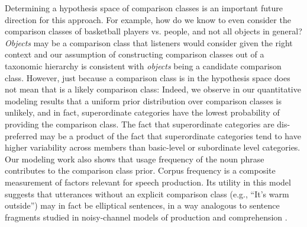 \documentclass[doc, floatsintext]{apa6}
\newcommand{\mht}[1]{\textcolor{Blue}{[mht: #1]}}
\begin{document}
Determining a hypothesis space of comparison classes is an important future direction for this approach.
For example, how do we know to even consider the comparison classes of basketball players vs. people, and not all objects in general?
\emph{Objects} may be a comparison class that listeners would consider given the right context and our assumption of constructing comparison classes out of a taxonomic hierarchy is consistent with \emph{objects} being a candidate comparison class.
However, just because a comparison class is in the hypothesis space does not mean that is a likely comparison class: Indeed, we observe in our quantitative modeling results that a uniform prior distribution over comparison classes is unlikely, and in fact, superordinate categories have the lowest probability of providing the comparison class.
The fact that superordinate categories are dis-preferred may be a product of the fact that superordinate categories tend to have higher variability across members than basic-level or subordinate level categories.
Our modeling work also shows that usage frequency of the noun phrase contributes to the comparison class prior.
Corpus frequency is a composite measurement of factors relevant for speech production.
Its utility in this model suggests that utterances without an explicit comparison class (e.g., ``It's warm outside'') may in fact be elliptical sentences, in a way analogous to sentence fragments studied in noisy-channel models of production and comprehension \cite{bergen2015strategic}.




\end{document}
